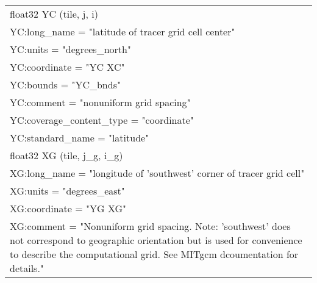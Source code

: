 \begin{longtable}{|p{\textwidth}|}
\rowcolor{Apricot}\hspace{0.5cm}float32 YC (tile, j, i)\\
\rowcolor{Apricot}\hspace{0.5cm}\hspace{0.5cm}YC:long\_name = "latitude of tracer grid cell center"\\
\rowcolor{Apricot}\hspace{0.5cm}\hspace{0.5cm}YC:units = "degrees\_north"\\
\rowcolor{Apricot}\hspace{0.5cm}\hspace{0.5cm}YC:coordinate = "YC XC"\\
\rowcolor{Apricot}\hspace{0.5cm}\hspace{0.5cm}YC:bounds = "YC\_bnds"\\
\rowcolor{Apricot}\hspace{0.5cm}\hspace{0.5cm}YC:comment = "nonuniform grid spacing"\\
\rowcolor{Apricot}\hspace{0.5cm}\hspace{0.5cm}YC:coverage\_content\_type = "coordinate"\\
\rowcolor{Apricot}\hspace{0.5cm}\hspace{0.5cm}YC:standard\_name = "latitude"\\
\rowcolor{Apricot}\hspace{0.5cm}float32 XG (tile, j\_g, i\_g)\\
\rowcolor{Apricot}\hspace{0.5cm}\hspace{0.5cm}XG:long\_name = "longitude of 'southwest' corner of tracer grid cell"\\
\rowcolor{Apricot}\hspace{0.5cm}\hspace{0.5cm}XG:units = "degrees\_east"\\
\rowcolor{Apricot}\hspace{0.5cm}\hspace{0.5cm}XG:coordinate = "YG XG"\\
\rowcolor{Apricot}\hspace{0.5cm}\hspace{0.5cm}XG:comment = "Nonuniform grid spacing. Note: 'southwest' does not correspond to geographic orientation but is used for convenience to describe the computational grid. See MITgcm dcoumentation for details."\\

\end{longtable}
